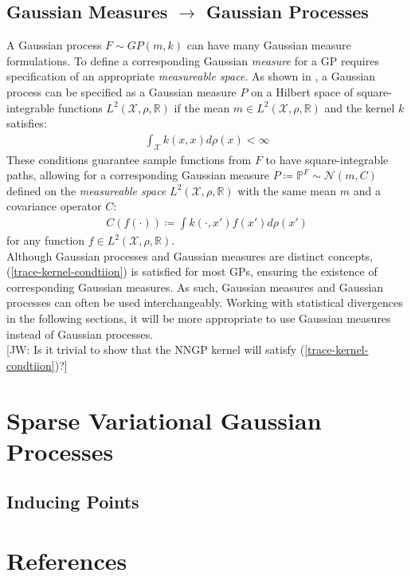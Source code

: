 \documentclass[twoside,11pt]{article}
\newcommand{\jw}[1]{{\color{gray} [JW: #1]}}
\begin{document}
\subsection{Gaussian Measures $\rightarrow$ Gaussian Processes \cite{wild2022generalized}}
A Gaussian process $F \sim GP(m, k)$ can have many Gaussian measure formulations. To define a corresponding Gaussian \textit{measure} for a GP requires specification of an appropriate \textit{measureable space}. As shown in \cite{wild2022generalized}, a Gaussian process can be specified as a Gaussian measure $P$ on a Hilbert space of square-integrable functions $L^2(\mathcal{X}, \rho, \mathbb{R})$ if the mean $m \in L^2(\mathcal{X}, \rho, \mathbb{R})$ and the kernel $k$ satisfies:
\begin{align}
    \int_{\mathcal{X}} k(x, x) d\rho(x) < \infty
    \label{trace-kernel-condtiion}
\end{align}
These conditions guarantee sample functions from $F$ to have square-integrable paths, allowing for a corresponding Gaussian measure $P \coloneqq \mathbb{P}^F \sim \mathcal{N}(m, C)$ defined on the \textit{measureable space} $L^2(\mathcal{X}, \rho, \mathbb{R})$ with the same mean $m$ and a covariance operator $C$:
\begin{align}
    C(f(\cdot)) \coloneqq \int k(\cdot, x')f(x')d \rho(x')
    \label{gm-covariance-operator}
\end{align}
for any function $f \in L^2(\mathcal{X}, \rho, \mathbb{R})$. \\
\newline 
Although Gaussian processes and Gaussian measures are distinct concepts, (\ref{trace-kernel-condtiion}) is satisfied for most GPs, ensuring the existence of corresponding Gaussian measures. As such, Gaussian measures and Gaussian processes can often be used interchangeably. Working with statistical divergences in the following sections, it will be more appropriate to use Gaussian measures instead of Gaussian processes.
\\\jw{Is it trivial to show that the NNGP kernel will satisfy (\ref{trace-kernel-condtiion})?}
\section{Sparse Variational Gaussian Processes \cite{wild2023connections}}

\subsection{Inducing Points \cite{terenin2022numerically}}

\begingroup
\let\clearpage\relax
\AtNextBibliography{\small}
\section*{References}
\printbibliography[heading=talikarng, title = {References}]
\endgroup
\end{document}
